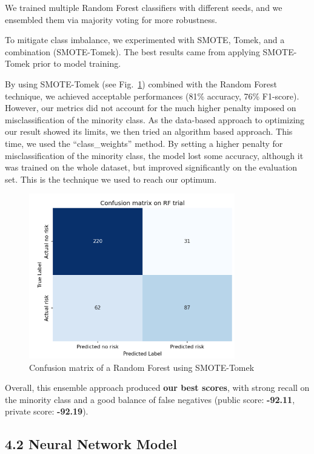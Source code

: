 \documentclass[12pt]{report}
\begin{document}
We trained multiple Random Forest classifiers with different seeds, and we ensembled them via majority voting for more robustness.

To mitigate class imbalance, we experimented with SMOTE, Tomek, and a combination (SMOTE-Tomek). The best results came from applying SMOTE-Tomek prior to model training.

By using SMOTE-Tomek (see Fig.~\ref{fig:rf_smottomek}) combined with the Random Forest technique, we achieved acceptable performances (81\% accuracy, 76\% F1-score). However, our metrics did not account for the much higher penalty imposed on misclassification of the minority class. As the data-based approach to optimizing our result showed its limits, we then tried an algorithm based approach. This time, we used the “class\_weights” method. By setting a higher penalty for misclassification of the minority class, the model lost some accuracy, although it was trained on the whole dataset, but improved significantly on the evaluation set. This is the technique we used to reach our optimum.

\begin{figure}[htbp]
    \centering
    \includegraphics[width=0.8\textwidth]{rf_smottomek.png}
    \caption{Confusion matrix of a Random Forest using SMOTE-Tomek}
    \label{fig:rf_smottomek}
\end{figure}


Overall, this ensemble approach produced \textbf{our best scores}, with strong recall on the minority class and a good balance of false negatives (public score: \textbf{-92.11}, private score: \textbf{-92.19}).



\subsection*{4.2 Neural Network Model}
\end{document}
